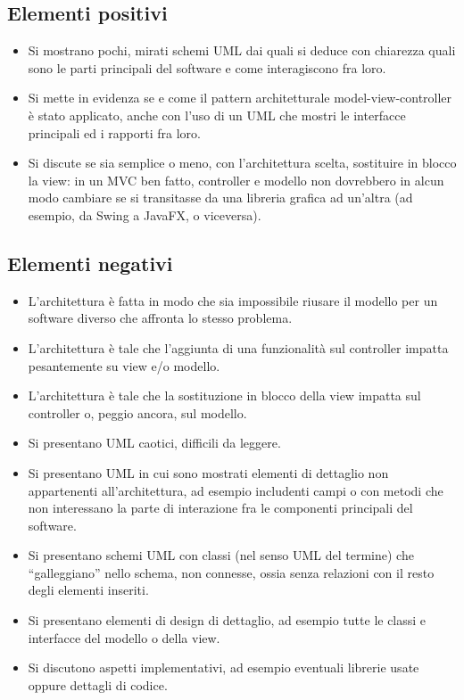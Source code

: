 \documentclass[a4paper,12pt]{report}
\begin{document}
\subsection*{Elementi positivi}
\begin{itemize}
	\item Si mostrano pochi, mirati schemi UML dai quali si deduce con chiarezza quali sono le parti principali del software e come interagiscono fra loro.
	\item Si mette in evidenza se e come il pattern architetturale model-view-controller è stato applicato, anche con l'uso di un UML che mostri le interfacce principali ed i rapporti fra loro.
	\item Si discute se sia semplice o meno, con l'architettura scelta, sostituire in blocco la view: in un MVC ben fatto, controller e modello non dovrebbero in alcun modo cambiare se si transitasse da una libreria grafica ad un'altra (ad esempio, da Swing a JavaFX, o viceversa).
\end{itemize}

\subsection*{Elementi negativi}
\begin{itemize}
	\item L'architettura è fatta in modo che sia impossibile riusare il modello per un software diverso che affronta lo stesso problema.
	\item L'architettura è tale che l'aggiunta di una funzionalità sul controller impatta pesantemente su view e/o modello.
	\item L'architettura è tale che la sostituzione in blocco della view impatta sul controller o, peggio ancora, sul modello.
	\item Si presentano UML caotici, difficili da leggere.
	\item Si presentano UML in cui sono mostrati elementi di dettaglio non appartenenti all'architettura, ad esempio includenti campi o con metodi che non interessano la parte di interazione fra le componenti principali del software.
	\item Si presentano schemi UML con classi (nel senso UML del termine) che ``galleggiano'' nello schema, non connesse, ossia senza relazioni con il resto degli elementi inseriti.
	\item Si presentano elementi di design di dettaglio, ad esempio tutte le classi e interfacce del modello o della view.
	\item Si discutono aspetti implementativi, ad esempio eventuali librerie usate oppure dettagli di codice.
\end{itemize}
\end{document}
